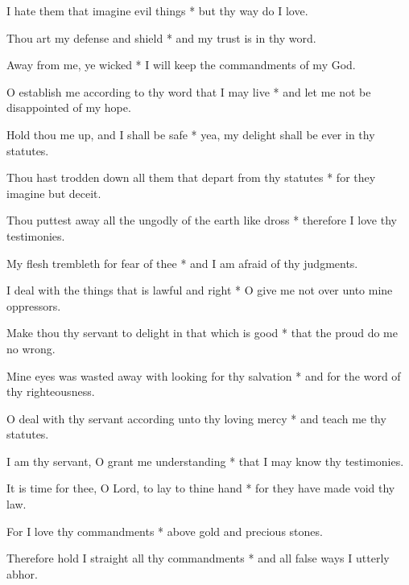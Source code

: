 I hate them that imagine evil things * but thy way do I love.

Thou art my defense and shield * and my trust is in thy word.

Away from me, ye wicked * I will keep the commandments of my God.

O establish me according to thy word that I may live * and let me not be disappointed of my hope.

Hold thou me up, and I shall be safe * yea, my delight shall be ever in thy statutes.

Thou hast trodden down all them that depart from thy statutes * for they imagine but deceit.

Thou puttest away all the ungodly of the earth like dross * therefore I love thy testimonies.

My flesh trembleth for fear of thee * and I am afraid of thy judgments.

I deal with the things that is lawful and right * O give me not over unto mine oppressors.

Make thou thy servant to delight in that which is good * that the proud do me no wrong.

Mine eyes was wasted away with looking for thy salvation * and for the word of thy righteousness.

O deal with thy servant according unto thy loving mercy * and teach me thy statutes.

I am thy servant, O grant me understanding * that I may know thy testimonies.

It is time for thee, O Lord, to lay to thine hand * for they have made void thy law.

For I love thy commandments * above gold and precious stones.

Therefore hold I straight all thy commandments * and all false ways I utterly abhor. 
